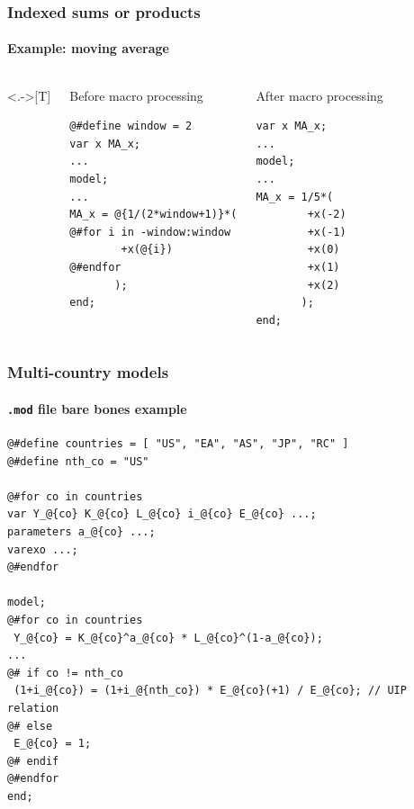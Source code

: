 \documentclass[handout,usepdftitle=false,xcolor=dvipsnames,aspectratio=169]{beamer}
\begin{document}
\begin{frame}[fragile]
  \frametitle{Indexed sums or products}
  \framesubtitle{Example: moving average}
  \begin{columns}<.->[T]
    \begin{block}{Before macro processing}
      \begin{verbatim}
@#define window = 2
var x MA_x;
...
model;
...
MA_x = @{1/(2*window+1)}*(
@#for i in -window:window
        +x(@{i})
@#endfor
       );
end;
\end{verbatim}
    \end{block}
    \begin{block}{After macro processing}
      \begin{verbatim}
var x MA_x;
...
model;
...
MA_x = 1/5*(
        +x(-2)
        +x(-1)
        +x(0)
        +x(1)
        +x(2)
       );
end;
\end{verbatim}
    \end{block}
  \end{columns}
\end{frame}

\begin{frame}[fragile]
  \frametitle{Multi-country models}
  \framesubtitle{\texttt{.mod} file bare bones example}
  \scriptsize
  \begin{verbatim}
@#define countries = [ "US", "EA", "AS", "JP", "RC" ]
@#define nth_co = "US"

@#for co in countries
var Y_@{co} K_@{co} L_@{co} i_@{co} E_@{co} ...;
parameters a_@{co} ...;
varexo ...;
@#endfor

model;
@#for co in countries
 Y_@{co} = K_@{co}^a_@{co} * L_@{co}^(1-a_@{co});
...
@# if co != nth_co
 (1+i_@{co}) = (1+i_@{nth_co}) * E_@{co}(+1) / E_@{co}; // UIP relation
@# else
 E_@{co} = 1;
@# endif
@#endfor
end;
\end{verbatim}
\end{frame}
\end{document}
